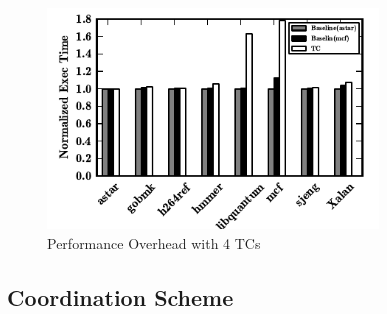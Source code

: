 \begin{figure}
    \begin{center}
        \includegraphics[width=3.46in]{figs/scalability.pdf}
        \caption{Performance Overhead with 4 TCs}
        \label{fig:scalability}
    \end{center}
\end{figure}

\subsection{Coordination Scheme}


